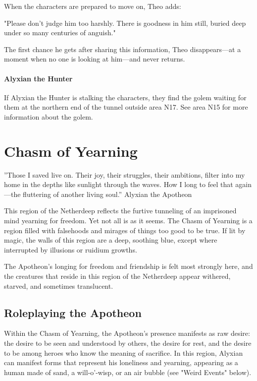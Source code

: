 \documentclass[10pt,a4paper,twoside,twocolumn,openany,nodeprecatedcode]{dndbook}
\begin{document}
When the characters are prepared to move on, Theo adds:

\begin{DndReadAloud}{}
"Please don't judge him too harshly. There is goodness in him still, buried deep under so many centuries of anguish."

\end{DndReadAloud}

The first chance he gets after sharing this information, Theo disappears—at a moment when no one is looking at him—and never returns.

\paragraph{Alyxian the Hunter}
If Alyxian the Hunter is stalking the characters, they find the golem waiting for them at the northern end of the tunnel outside area N17. See area N15 for more information about the golem.

\section{Chasm of Yearning}
\DndQuote%
{}
{''Those I saved live on. Their joy, their struggles, their ambitions, filter into my home in the depths like sunlight through the waves. How I long to feel that again—the fluttering of another living soul.''}
{Alyxian the Apotheon}

This region of the Netherdeep reflects the furtive tunneling of an imprisoned mind yearning for freedom. Yet not all is as it seems. The Chasm of Yearning is a region filled with falsehoods and mirages of things too good to be true. If lit by magic, the walls of this region are a deep, soothing blue, except where interrupted by illusions or ruidium growths.

The Apotheon's longing for freedom and friendship is felt most strongly here, and the creatures that reside in this region of the Netherdeep appear withered, starved, and sometimes translucent.

\subsection{Roleplaying the Apotheon}
Within the Chasm of Yearning, the Apotheon's presence manifests as raw desire: the desire to be seen and understood by others, the desire for rest, and the desire to be among heroes who know the meaning of sacrifice. In this region, Alyxian can manifest forms that represent his loneliness and yearning, appearing as a human made of sand, a will-o'-wisp, or an air bubble (see "Weird Events" below).
\end{document}
